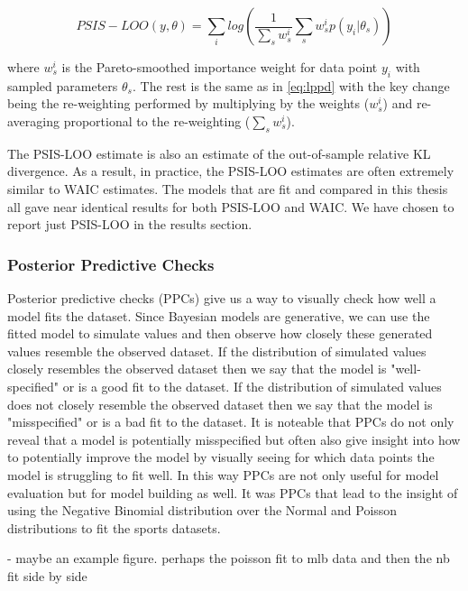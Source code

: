\begin{equation} \label{eq:psis-loo}
PSIS-LOO(y, \theta) = \sum_i log \left( \frac{1}{\sum_s w_s^i} \sum_s w_s^i p(y_i | \theta_s) \right)
\end{equation}

where $w_s^i$ is the Pareto-smoothed importance weight for data point $y_i$ with sampled parameters $\theta_s$. The rest is the same as in \ref{eq:lppd} with the key change being the re-weighting performed by multiplying by the weights ($w_s^i$) and re-averaging proportional to the re-weighting ($\sum_s w_s^i$).

The PSIS-LOO estimate is also an estimate of the out-of-sample relative KL divergence. As a result, in practice, the PSIS-LOO estimates are often extremely similar to WAIC estimates. The models that are fit and compared in this thesis all gave near identical results for both PSIS-LOO and WAIC. We have chosen to report just PSIS-LOO in the results section.

\subsubsection{Posterior Predictive Checks}

Posterior predictive checks (PPCs) give us a way to visually check how well a model fits the dataset. Since Bayesian models are generative, we can use the fitted model to simulate values and then observe how closely these generated values resemble the observed dataset. If the distribution of simulated values closely resembles the observed dataset then we say that the model is "well-specified" or is a good fit to the dataset. If the distribution of simulated values does not closely resemble the observed dataset then we say that the model is "misspecified" or is a bad fit to the dataset. It is noteable that PPCs do not only reveal that a model is potentially misspecified but often also give insight into how to potentially improve the model by visually seeing for which data points the model is struggling to fit well. In this way PPCs are not only useful for model evaluation but for model building as well. It was PPCs that lead to the insight of using the Negative Binomial distribution over the Normal and Poisson distributions to fit the sports datasets.

- maybe an example figure. perhaps the poisson fit to mlb data and then the nb fit side by side
